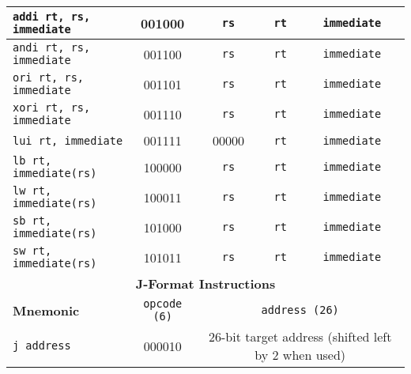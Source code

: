 \documentclass[a4paper, 10pt]{article}
\begin{document}
\begin{table}[ht]
\begin{tabularx}{\textwidth}{|X|c|c|c|c|c|c|}
        \texttt{addi rt, rs, immediate}         & 001000 & \texttt{rs}   & \texttt{rt}   & \multicolumn{3}{c|}{\texttt{immediate}}\\ \hline
        \texttt{andi rt, rs, immediate}         & 001100 & \texttt{rs}   & \texttt{rt}   & \multicolumn{3}{c|}{\texttt{immediate}}  \\ \hline
        \texttt{ori rt, rs, immediate}          & 001101 & \texttt{rs}   & \texttt{rt}   & \multicolumn{3}{c|}{\texttt{immediate}}  \\ \hline
        \texttt{xori rt, rs, immediate}         & 001110 & \texttt{rs}   & \texttt{rt}   & \multicolumn{3}{c|}{\texttt{immediate}}  \\ \hline
        \texttt{lui rt, immediate}              & 001111 & 00000         & \texttt{rt}   & \multicolumn{3}{c|}{\texttt{immediate}}  \\ \hline
        \texttt{lb rt, immediate(rs)}           & 100000 & \texttt{rs}   & \texttt{rt}   & \multicolumn{3}{c|}{\texttt{immediate}}  \\ \hline
        \texttt{lw rt, immediate(rs)}           & 100011 & \texttt{rs}   & \texttt{rt}   & \multicolumn{3}{c|}{\texttt{immediate}}  \\ \hline
        \texttt{sb rt, immediate(rs)}           & 101000 & \texttt{rs}   & \texttt{rt}   & \multicolumn{3}{c|}{\texttt{immediate}}  \\ \hline
        \texttt{sw rt, immediate(rs)}           & 101011 & \texttt{rs}   & \texttt{rt}   & \multicolumn{3}{c|}{\texttt{immediate}}  \\ \hline
        \multicolumn{7}{|c|}{\textbf{J-Format Instructions}} \\ \hline
        \textbf{Mnemonic} & \texttt{opcode (6)} & \multicolumn{5}{c|}{\texttt{address (26)}} \\ \hline
        \texttt{j address}   & 000010  & \multicolumn{5}{c|}{26-bit target address (shifted left by 2 when used)} \\ \hline
    \end{tabularx}
\end{table}
\end{document}
